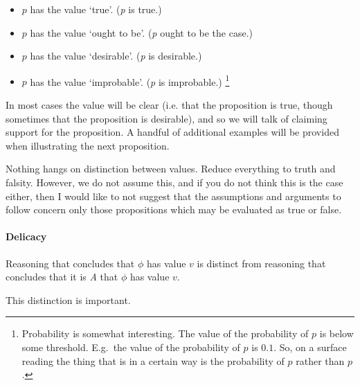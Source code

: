 \begin{note}
    \begin{itemize}
  \item \(p\) has the value `true'. \hfill (\emph{p} is true.)
  \item \(p\) has the value `ought to be'. \hfill (\emph{p} ought to be the case.)
  \item \(p\) has the value `desirable'. \hfill (\emph{p} is desirable.)
  \item \(p\) has the value `improbable'. \hfill (\emph{p} is improbable.)\nolinebreak
    \footnote{
      Probability is somewhat interesting.
      The value of the probability of \(p\) is below some threshold.
      E.g.\ the value of the probability of \(p\) is \(0.1\).
      So, on a surface reading the thing that is in a certain way is the probability of \(p\) rather than \(p\).
    }
  \end{itemize}
\end{note}

\begin{note}
In most cases the value will be clear (i.e. that the proposition is true, though sometimes that the proposition is desirable), and so we will talk of claiming support for the proposition.
  A handful of additional examples will be provided when illustrating the next proposition.
\end{note}

\begin{note}
  Nothing hangs on distinction between values.
  Reduce everything to truth and falsity.
  However, we do not assume this, and if you do not think this is the case either, then I would like to not suggest that the assumptions and arguments to follow concern only those propositions which may be evaluated as true or false.
\end{note}

\paragraph{Delicacy}

\begin{note}
  Reasoning that concludes that \(\phi\) has value \(v\) is distinct from reasoning that concludes that it is \emph{A} that \(\phi\) has value \(v\).

  This distinction is important.
\end{note}

